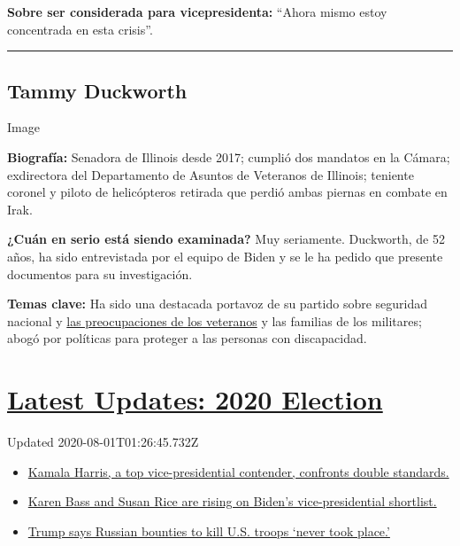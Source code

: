 \textbf{Sobre ser considerada para vicepresidenta:} ``Ahora mismo estoy
concentrada en esta crisis''.

\begin{center}\rule{0.5\linewidth}{\linethickness}\end{center}

\hypertarget{tammy-duckworth}{%
\subsection{Tammy Duckworth}\label{tammy-duckworth}}

Image

\textbf{Biografía:} Senadora de Illinois desde 2017; cumplió dos
mandatos en la Cámara; exdirectora del Departamento de Asuntos de
Veteranos de Illinois; teniente coronel y piloto de helicópteros
retirada que perdió ambas piernas en combate en Irak.

\textbf{¿Cuán en serio está siendo examinada?} Muy seriamente.
Duckworth, de 52 años, ha sido entrevistada por el equipo de Biden y se
le ha pedido que presente documentos para su investigación.

\textbf{Temas clave:} Ha sido una destacada portavoz de su partido sobre
seguridad nacional y
\href{https://www.nytimes3xbfgragh.onion/2018/03/26/us/army-veteran-deported.html}{las
preocupaciones de los veteranos} y las familias de los militares; abogó
por políticas para proteger a las personas con discapacidad.

\hypertarget{latest-updates-2020-election}{%
\section{\texorpdfstring{\href{https://www.nytimes3xbfgragh.onion/2020/07/31/us/elections/biden-vs-trump.html?action=click\&pgtype=Article\&state=default\&region=MAIN_CONTENT_1\&context=storylines_live_updates}{Latest
Updates: 2020
Election}}{Latest Updates: 2020 Election}}\label{latest-updates-2020-election}}

Updated 2020-08-01T01:26:45.732Z

\begin{itemize}
\tightlist
\item
  \href{https://www.nytimes3xbfgragh.onion/2020/07/31/us/elections/biden-vs-trump.html?action=click\&pgtype=Article\&state=default\&region=MAIN_CONTENT_1\&context=storylines_live_updates\#link-29fdff45}{Kamala
  Harris, a top vice-presidential contender, confronts double
  standards.}
\item
  \href{https://www.nytimes3xbfgragh.onion/2020/07/31/us/elections/biden-vs-trump.html?action=click\&pgtype=Article\&state=default\&region=MAIN_CONTENT_1\&context=storylines_live_updates\#link-13ec3d9c}{Karen
  Bass and Susan Rice are rising on Biden's vice-presidential
  shortlist.}
\item
  \href{https://www.nytimes3xbfgragh.onion/2020/07/31/us/elections/biden-vs-trump.html?action=click\&pgtype=Article\&state=default\&region=MAIN_CONTENT_1\&context=storylines_live_updates\#link-49e9a016}{Trump
  says Russian bounties to kill U.S. troops `never took place.'}
\end{itemize}

